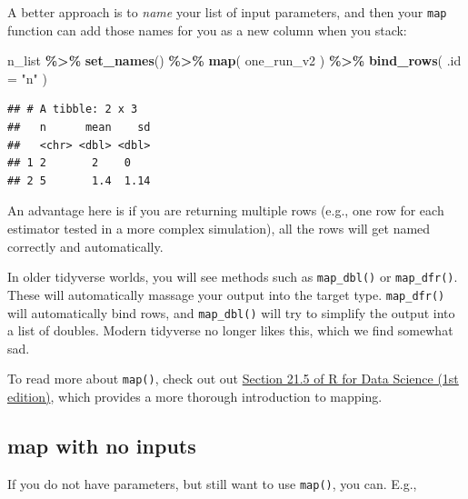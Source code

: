 \documentclass[
]{book}
\newenvironment{Shaded}{\begin{snugshade}}{\end{snugshade}}
\newcommand{\AttributeTok}[1]{\textcolor[rgb]{0.13,0.29,0.53}{#1}}
\newcommand{\FunctionTok}[1]{\textcolor[rgb]{0.13,0.29,0.53}{\textbf{#1}}}
\newcommand{\NormalTok}[1]{#1}
\newcommand{\OtherTok}[1]{\textcolor[rgb]{0.56,0.35,0.01}{#1}}
\newcommand{\SpecialCharTok}[1]{\textcolor[rgb]{0.81,0.36,0.00}{\textbf{#1}}}
\newcommand{\StringTok}[1]{\textcolor[rgb]{0.31,0.60,0.02}{#1}}
\begin{document}
\begin{Shaded}
\end{Shaded}

A better approach is to \emph{name} your list of input parameters, and then your \texttt{map} function can add those names for you as a new column when you stack:

\begin{Shaded}
\begin{Highlighting}[]
\NormalTok{n\_list }\SpecialCharTok{\%\textgreater{}\%}
  \FunctionTok{set\_names}\NormalTok{() }\SpecialCharTok{\%\textgreater{}\%}
  \FunctionTok{map}\NormalTok{( one\_run\_v2 ) }\SpecialCharTok{\%\textgreater{}\%}
  \FunctionTok{bind\_rows}\NormalTok{( }\AttributeTok{.id =} \StringTok{"n"}\NormalTok{ )}
\end{Highlighting}
\end{Shaded}

\begin{verbatim}
## # A tibble: 2 x 3
##   n      mean    sd
##   <chr> <dbl> <dbl>
## 1 2       2    0   
## 2 5       1.4  1.14
\end{verbatim}

An advantage here is if you are returning multiple rows (e.g., one row for each estimator tested in a more complex simulation), all the rows will get named correctly and automatically.

In older tidyverse worlds, you will see methods such as \texttt{map\_dbl()} or \texttt{map\_dfr()}. These will automatically massage your output into the target type. \texttt{map\_dfr()} will automatically bind rows, and \texttt{map\_dbl()} will try to simplify the output into a list of doubles. Modern tidyverse no longer likes this, which we find somewhat sad.

To read more about \texttt{map()}, check out out \href{https://r4ds.had.co.nz/iteration.html\#the-map-functions}{Section 21.5 of R for Data Science (1st edition)}, which provides a more thorough introduction to mapping.

\subsection{map with no inputs}\label{map-with-no-inputs}

If you do not have parameters, but still want to use \texttt{map()}, you can. E.g.,
\end{document}
